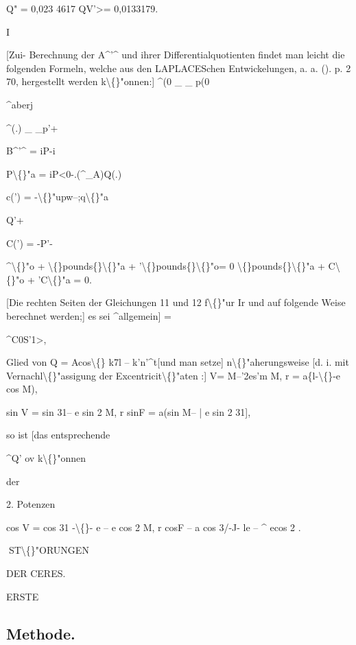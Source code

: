 \documentclass[10pt,a4paper]{article}
\begin{document}
Q" = 0,023 4617
QV'>= 0,0133179.

I

[Zui- Berechnung der A\textasciicircum{}'\textasciicircum{} und ihrer Differentialquotienten findet man
leicht die folgenden Formeln, welche aus den LAPLACESchen Entwickelungen,
a. a. (). p. 2 70, hergestellt werden k\textbackslash\{\}"onnen:]
\textasciicircum{}(0 \_ \_ p(0

\textasciicircum{}aberj

\textasciicircum{}(.) \_ \_p'+

B\textasciicircum{}'\textasciicircum{} = iP-i

P\textbackslash\{\}"a = iP<0-.(\textasciicircum{}\_A)Q(.)

c(') = -\textbackslash\{\}"upw--;q\textbackslash\{\}"a

Q'+

C(') = -P'-

\textasciicircum{}\textbackslash\{\}"o + \textbackslash\{\}pounds\{\}\textbackslash\{\}"a + '\textbackslash\{\}pounds\{\}\textbackslash\{\}"o= 0
\textbackslash\{\}pounds\{\}\textbackslash\{\}"a + C\textbackslash\{\}"o + 'C\textbackslash\{\}"a = 0.

[Die rechten Seiten der Gleichungen 11 und 12 f\textbackslash\{\}"ur Ir und
auf folgende Weise berechnet werden;] es sei \textasciicircum{}allgemein]
=

\textasciicircum{}C0S'1>,

Glied von Q = Acos\textbackslash\{\} k7l -- k'n'\textasciicircum{}t[und man setze] n\textbackslash\{\}"aherungsweise
[d. i. mit Vernachl\textbackslash\{\}"assigung
der Excentricit\textbackslash\{\}"aten :]
V= M--'2es'm M,
r = a\{l-\textbackslash\{\}-e cos M),

sin V = sin 31-- e sin 2 M,
r sinF = a(sin M-- | e sin 2 31],

so ist [das entsprechende

\textasciicircum{}Q'
ov k\textbackslash\{\}"onnen

der

2. Potenzen

cos V = cos 31 -\textbackslash\{\}- e -- e cos 2 M,
r cosF -- a cos 3/-J- le -- \textasciicircum{} ecos 2 .

\newpage
ST\textbackslash\{\}"ORUNGEN

DER CERES.

ERSTE

\subsection*{Methode.}
\end{document}
